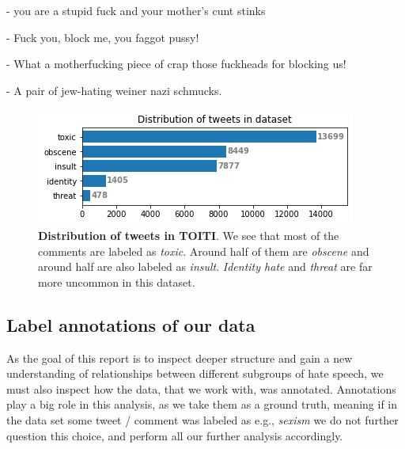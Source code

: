 \documentclass[fleqn,moreauthors,10pt]{ds_report}
\newcommand\bm{0.2pt}
\begin{document}
\begin{tcolorbox}[width=0.9\linewidth, center,arc=8pt,sharp corners=downhill, boxrule=0.3pt, left=\bm, top=\bm, right=\bm, bottom=\bm, fontupper=\small]
 - you are a stupid fuck and your mother's cunt stinks
\end{tcolorbox}

\begin{tcolorbox}[width=0.9\linewidth, center,arc=8pt,sharp corners=downhill, boxrule=0.3pt, left=\bm, top=\bm, right=\bm, bottom=\bm, fontupper=\small]
 - Fuck you, block me, you faggot pussy!
\end{tcolorbox}

\begin{tcolorbox}[width=0.9\linewidth, center,arc=8pt,sharp corners=downhill, boxrule=0.3pt, left=\bm, top=\bm, right=\bm, bottom=\bm, fontupper=\small]
 - What a motherfucking piece of crap those fuckheads for blocking us!
\end{tcolorbox}

\begin{tcolorbox}[width=0.9\linewidth, center,arc=8pt,sharp corners=downhill, boxrule=0.3pt, left=\bm, top=\bm, right=\bm, bottom=\bm, fontupper=\small]
 - A pair of jew-hating weiner nazi schmucks.
\end{tcolorbox}


\begin{figure}
	\includegraphics[width=\linewidth]{distribution_wiki_dataset.png}
	\caption{\textbf{Distribution of tweets in TOITI}. We see that most of the comments are labeled as \textit{toxic}. Around half of them are \textit{obscene} and around half are also labeled as \textit{insult}. \textit{Identity hate} and \textit{threat} are far more uncommon in this dataset.}
	\label{fig:distribution_wiki_dataset}
\end{figure}


\subsection*{Label annotations of our data}
As the goal of this report is to inspect deeper structure and gain a new understanding of relationships between different subgroups of hate speech, we must also inspect how the data, that we work with, was annotated. Annotations play a big role in this analysis, as we take them as a ground truth, meaning if in the data set some tweet / comment was labeled as e.g., \textit{sexism} we do not further question this choice, and perform all our further analysis accordingly.
\end{document}
